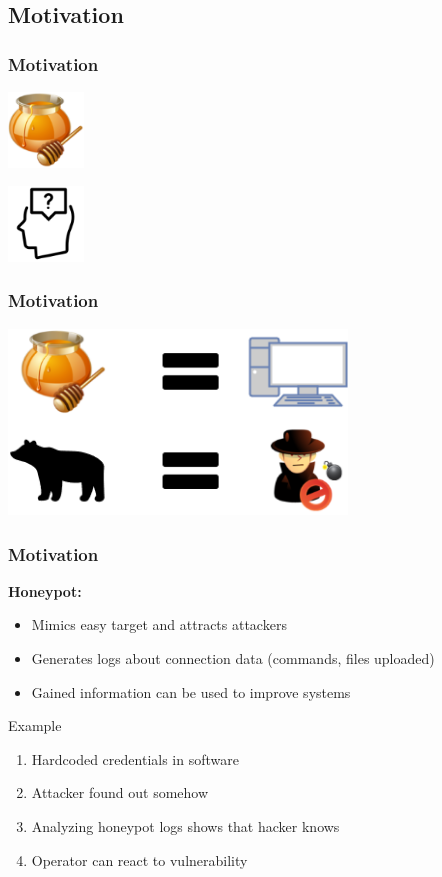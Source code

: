 \documentclass[11pt,t,usepdftitle=false,aspectratio=169]{beamer}
\begin{document}
\subsection{Motivation}
\begin{frame}
	\frametitle{Motivation}	
	\begin{center}
	\includegraphics[width=20mm]{_images/honeypot.png}
	\end{center}
	\begin{center}
	\includegraphics[width=20mm]{_images/head_question.png}
	\end{center}
\end{frame}
\begin{frame}
\frametitle{Motivation}	
\begin{center}
	\includegraphics[width=90mm]{_images/Visualization_Honeypot_Bear.png}
\end{center}
\end{frame}
\begin{frame}
	\frametitle{Motivation}
	
	\textbf{Honeypot:}
	\begin{itemize}
		\item Mimics easy target and attracts attackers
		\item Generates logs about connection data (commands, files uploaded)
		\item Gained information can be used to improve systems		
	\end{itemize}
	\pause
	 \begin{exampleblock}{Example}
	 	\begin{enumerate}
	 		\item Hardcoded credentials in software
	 		\item Attacker found out somehow
	 		\item Analyzing honeypot logs shows that hacker knows
	 		\item Operator can react to vulnerability
	 	\end{enumerate}
	\end{exampleblock}
\end{frame}
\end{document}
